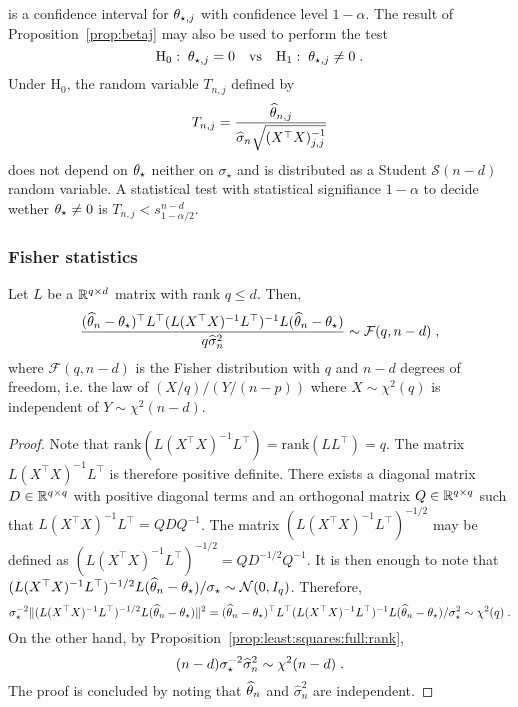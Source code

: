  is a confidence interval for $\theta_{\star,j}$ with confidence level $1-\alpha$. The result of Proposition~\ref{prop:betaj} may also be used to perform the test 
\[
\mathrm{H}_0:\; \theta_{\star,j} = 0 \quad\mathrm{vs} \quad \mathrm{H}_1:\; \theta_{\star,j} \neq 0\;.
\]
Under $\mathrm{H}_0$, the random variable $T_{n,j}$ defined by 
\[
T_{n,j} = \frac{\widehat {\theta}_{n,j}}{\widehat\sigma_{n}\sqrt{(X^\top X)_{j,j}^{-1}}} 
\] 
does not depend  on $\theta_{\star}$ neither on $\sigma_{\star}$ and is distributed as a Student $\mathcal{S}(n-d)$ random variable. A statistical test with statistical signifiance $1-\alpha$ to decide wether $\theta_{\star}\neq 0$ is $T_{n,j}<s_{1-\alpha/2}^{n-d}$. 
\subsubsection*{Fisher statistics}
\begin{shaded}
\begin{proposition}
\label{prop:Lbeta}
Let $L$ be a $\mathbb{R}^{q\times d}$ matrix with rank $q\leqslant d$. Then,
\[
\frac{(\widehat {\theta}_{n} -\theta_{\star})^\top L^\top(L(X^\top X)^{-1}L^\top)^{-1}L(\widehat {\theta}_{n} -\theta_{\star})}{q\widehat\sigma^2_{n}} \sim \mathcal{F}(q,n-d)\;,
\]
where $\mathcal{F}(q,n-d)$ is the Fisher distribution with $q$ and $n-d$ degrees of freedom, i.e. the law of $(X/q)/(Y/(n-p))$ where $X\sim\chi^2(q)$ is independent of $Y\sim\chi^2(n-d)$.
\end{proposition}
\end{shaded}
\begin{proof}
Note that $\mathrm{rank}(L(X^\top X)^{-1}L^\top) = \mathrm{rank}(LL^\top)  = q$. The matrix $L(X^\top X)^{-1}L^\top$ is therefore positive definite. There exists a diagonal matrix $D\in\mathbb{R}^{q\times q}$ with positive diagonal terms and an orthogonal matrix $Q\in\mathbb{R}^{q\times q}$ such that $L(X^\top X)^{-1}L^\top = QDQ^{-1}$. The matrix $(L(X^\top X)^{-1}L^\top)^{-1/2}$ may be defined as $(L(X^\top X)^{-1}L^\top)^{-1/2} = QD^{-1/2}Q^{-1}$. It is then enough to note that $(L(X^\top X)^{-1}L^\top)^{-1/2}L(\widehat {\theta}_{n} -\theta_{\star})/\sigma_{\star}\sim \mathcal{N}(0,I_q)$. Therefore,
\[
\sigma^{-2}_{\star}\|(L(X^\top X)^{-1}L^\top)^{-1/2}L(\widehat {\theta}_{n} -\theta_{\star})\|^2 = (\widehat {\theta}_{n} -\theta_{\star})^\top L^\top(L(X^\top X)^{-1}L^\top)^{-1}L(\widehat {\theta}_{n} -\theta_{\star})/\sigma^2_{\star} \sim \chi^2(q)\;.
\]
On the other hand, by Proposition~\ref{prop:least:squares:full:rank}, 
\[
(n-d)\sigma^{-2}_{\star}\widehat\sigma^2_{n} \sim \chi^2(n-d)\;.
\]
The proof is concluded by noting that $\widehat {\theta}_n$ and  $\widehat\sigma^2_{n}$ are independent.
\end{proof}
